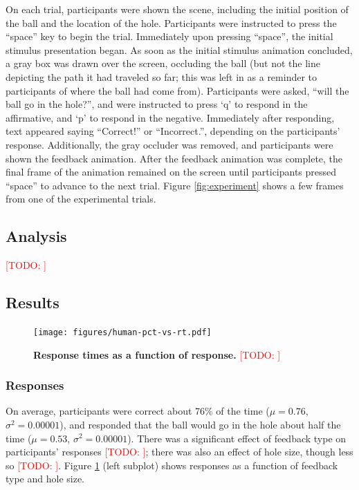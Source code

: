 \documentclass[11pt]{article}
\newcommand{\TODO}[1]{\textcolor{red}{[TODO: #1]}}
\begin{document}
On each trial, participants were shown the scene, including the initial position of the ball and the location of the hole. Participants were instructed to press the ``space'' key to begin the trial. Immediately upon pressing ``space'', the initial stimulus presentation began. As soon as the initial stimulus animation concluded, a gray box was drawn over the screen, occluding the ball (but not the line depicting the path it had traveled so far; this was left in as a reminder to participants of where the ball had come from). Participants were asked, ``will the ball go in the hole?'', and were instructed to press `q' to respond in the affirmative, and `p' to respond in the negative. Immediately after responding, text appeared saying ``Correct!'' or ``Incorrect.'', depending on the participants' response. Additionally, the gray occluder was removed, and participants were shown the feedback animation. After the feedback animation was complete, the final frame of the animation remained on the screen until participants pressed ``space'' to advance to the next trial. Figure \ref{fig:experiment} shows a few frames from one of the experimental trials.

\subsection{Analysis}

\TODO{}

\subsection{Results}

\begin{figure}[t]
    \begin{center}
        \texttt{[image: figures/human-pct-vs-rt.pdf]}
        \caption{\textbf{Response times as a function of response.} \TODO{}}
        \label{fig:pct-vs-rt}
    \end{center}
\end{figure}

\subsubsection{Responses}

On average, participants were correct about 76\% of the time ($\mu=0.76$, $\sigma^2=0.00001$), and responded that the ball would go in the hole about half the time ($\mu=0.53$, $\sigma^2=0.00001$). There was a significant effect of feedback type on participants' responses \TODO{}; there was also an effect of hole size, though less so \TODO{}. Figure \ref{fig:pct-vs-rt} (left subplot) shows responses as a function of feedback type and hole size.
\end{document}
